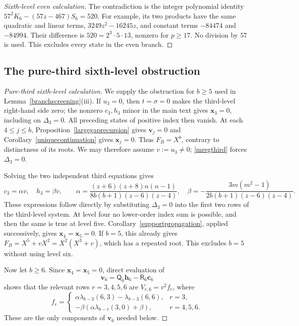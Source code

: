 \documentclass[12pt]{article}
\theoremstyle{remark}
\begin{document}
\begin{proof}[Sixth-level even calculation]
The contradiction is the integer polynomial identity
$57^2K_6-(57z-467)S_6=520$.  For example, its two products have the same quadratic and linear terms,
$3249z^2-16245z$, and constant terms $-84474$ and $-84994$.
Their difference is $520=2^3\cdot5\cdot13$, nonzero for $p\ge17$.
No division by $57$ is used.  This excludes every state in the even
branch.
\end{proof}

\subsection{The pure-third sixth-level obstruction}\label{app:purethird}

\begin{proof}[Pure-third sixth-level calculation]
We supply the obstruction for $b\ge5$ used in
Lemma~\ref{branchscreening}(iii).  If $u_3=0$, then $t=\sigma=0$ makes the third-level right-hand side
zero; the nonzero $c_3,h_3$ minor in the main text gives
$\mathbf x_3=0$, including on $\Delta_3=0$.  All preceding states of positive index then vanish.
At each $4\le j\le b$, Proposition~\ref{largegaprecursion} gives
$\mathbf v_j=0$ and Corollary~\ref{uniquecontinuation} gives
$\mathbf x_j=0$.  Thus $F_B=X^b$, contrary to distinctness of its roots.
We may therefore assume $v:=u_3\ne0$; \eqref{mregthird} forces
$\Delta_3=0$.

Solving the two independent third equations gives
\begin{equation}\label{thirdprofileparameters}
 c_3=\alpha v,\quad h_3=\beta v,\qquad
 \alpha=\frac{(z+6)(z+8)n(n-1)}{8b(b+1)(z-6)(z-4)},\quad
 \beta=-\frac{3m(m^2-1)}{2b(b+1)(z-6)(z-4)}.
\end{equation}
These expressions follow directly by substituting $\Delta_3=0$ into
the first two rows of the third-level system.
At level four no lower-order index sum is possible, and then the same
is true at level five.  Corollary~\ref{supportpropagation}, applied
successively, gives $\mathbf x_4=\mathbf x_5=0$.
If $b=5$, this already gives
$F_B=X^5+vX^2=X^2(X^3+v)$, which has a repeated root.  This excludes $b=5$ without using level six.

Now let $b\ge6$.  Since $\mathbf x_4=\mathbf x_5=0$, direct
evaluation of
\[
 \mathbf v_6=\mathsf Q_6\mathbf h_6-\mathsf R_6\mathbf c_6
\]
shows that the relevant rows $r=3,4,5,6$ are $V_{r,6}=v^2f_r$, where
\begin{equation}\label{purethirdprofile}
 f_r=\begin{cases}
 \alpha\lambda_{b-3}(6,3)-\lambda_{b-3}(6,6),&r=3,\\[1mm]
 -\beta(\alpha\lambda_{b-r}(3,0)+\beta),&r=4,5,6.
 \end{cases}
\end{equation}
These are the only components of $\mathbf v_6$ needed below.


\end{proof}
\end{document}
